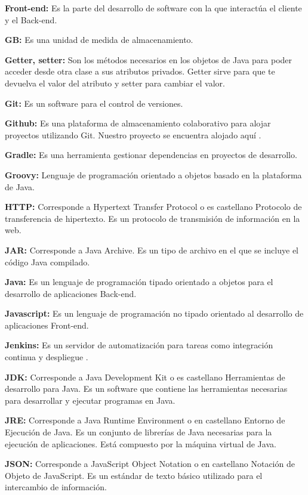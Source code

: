 \documentclass[12pt]{report} %
\begin{document}
\textbf{Front-end:} Es la parte del desarrollo de software con la que interactúa el cliente y el Back-end.

\textbf{GB:} Es una unidad de medida de almacenamiento.

\textbf{Getter, setter:} Son los métodos necesarios en los objetos de Java para poder acceder desde otra clase a sus atributos privados. Getter sirve para que te devuelva el valor del atributo y setter para cambiar el valor.

\textbf{Git:} Es un software para el control de versiones. 

\textbf{Github:} Es una plataforma de almacenamiento colaborativo para alojar proyectos utilizando Git. Nuestro proyecto se encuentra alojado aquí \cite{repositorio}.

\textbf{Gradle:} Es una herramienta gestionar dependencias en proyectos de desarrollo.

\textbf{Groovy:} Lenguaje de programación orientado a objetos basado en la plataforma de Java.

\textbf{HTTP:} Corresponde a Hypertext Transfer Protocol o es castellano Protocolo de transferencia de hipertexto. Es un protocolo de transmisión de información en la web.

\textbf{JAR:} Corresponde a Java Archive. Es un tipo de archivo en el que se incluye el código Java compilado.

\textbf{Java:} Es un lenguaje de programación tipado orientado a objetos para el desarrollo de aplicaciones Back-end.

\textbf{Javascript:} Es un lenguaje de programación no tipado orientado al desarrollo de aplicaciones Front-end.

\textbf{Jenkins:} Es un servidor de automatización para tareas como integración continua y despliegue \cite{jenkins}.

\textbf{JDK:} Corresponde a Java Development Kit o es castellano Herramientas de desarrollo para Java. Es un software que contiene las herramientas necesarias para desarrollar y ejecutar programas en Java.

\textbf{JRE:} Corresponde a Java Runtime Environment o en castellano Entorno de Ejecución de Java. Es un conjunto de librerías de Java necesarias para la ejecución de aplicaciones. Está compuesto por la máquina virtual de Java.

\textbf{JSON:} Corresponde a JavaScript Object Notation o en castellano Notación de Objeto de JavaScript. Es un estándar de texto básico utilizado para el intercambio de información.
\end{document}
